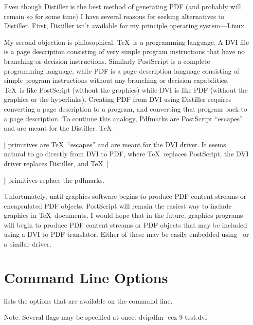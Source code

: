 Even though Distiller is the best method of generating PDF (and
probably will remain so for some time) I have several reasons for
seeking alternatives to Distiller.
First, Distiller isn't available for my principle operating
system---Linux.

My second objection is philosophical.
\TeX\ is a programming language.
A DVI file is a page description consisting of very
simple program instructions that have no branching or
decision instructions.
Similarly PostScript is a complete programming language,
while PDF is a page description language consisting
of simple program instructions
without any branching or decision capabilities.
\TeX\ is like PostScript (without the graphics)
while DVI is like PDF (without the graphics or the hyperlinks).
Creating PDF from DVI using Distiller requires converting a page description to a program,
and converting that program back to a page description.
To continue this analogy,
Pdfmarks are PostScript ``escapes'' and are meant for the Distiller.
\TeX\ |\special| primitives are \TeX\ ``escapes'' and are meant for the DVI driver.
It seems natural to go directly from DVI to PDF, where \TeX\ replaces
PostScript, the DVI driver replaces Distiller,
and \TeX\ |\special| primitives replace the pdfmarks.

Unfortunately, until graphics software
begins to produce PDF content streams or encapsulated
PDF objects, PostScript will remain the easiest
way to include graphics in \TeX\ documents.
I would hope that in the future, graphics programs
will begin to produce PDF content streams or PDF objects that
may be included using a DVI to PDF translator.  Either
of these may be easily embedded using \dvipdfm\ or a similar driver.

\section{Command Line Options}
 lists the options
that are available on the command line.
\par\noindent
Note: Several flags may be specified at once:
\example
\begintt
dvipdfm -ecz 9 test.dvi
\endtt

